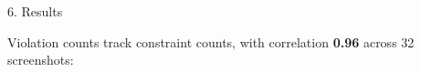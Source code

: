 \documentclass[final]{beamer}
\newlength{\colwidth}
\begin{document}
\begin{frame}[t]
\begin{columns}[t]
\begin{column}{\colwidth}
\begin{block}{6. Results}

    Violation counts track constraint counts, with correlation \textbf{0.96}
    across 32 screenshots:


\end{block}
\end{column}
\end{columns}
\end{frame}
\end{document}

